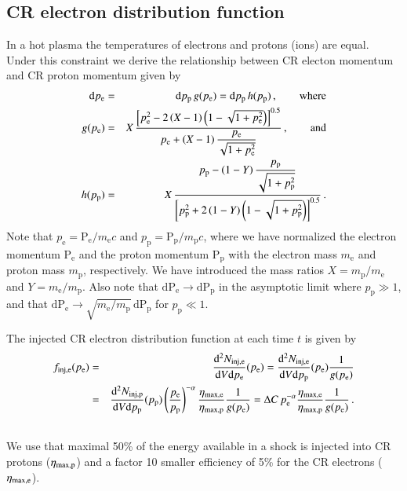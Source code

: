 \documentclass[useAMS,usenatbib]{mn2e}
\newcommand{\dd}{\mathrm{d}}
\newcommand{\p}{\mathrm{p}}
\newcommand{\Pp}{\mathrm{P}_\mathrm{p}}
\newcommand{\Pe}{\mathrm{P}_\mathrm{e}}
\newcommand{\pp}{p_\mathrm{p}}
\newcommand{\pe}{p_\mathrm{e}}
\newcommand{\e}{\mathrm{e}}
\begin{document}
\subsection{CR electron distribution function} 
In a hot plasma the temperatures of electrons and protons (ions) are
equal. Under this constraint we derive the relationship between CR
electon momentum and CR proton momentum given by
\begin{eqnarray}
  \label{eq:pe_pp}
\dd \pe &=& \dd \pp \,g(\pe) =  \dd \pp \,h(\pp)\,,\qquad \rmn{where}\\
g(\pe) &=& X \,\frac{\left[\pe^2-2\left(X-1\right)\left(1-\sqrt{1+\pe^2}\right)\right]^{0.5}}{\displaystyle\pe+\left(X-1\right)\frac{\pe}{\sqrt{1+\pe^2}}}\,,\qquad \rmn{and}\\
h(\pp) &=& X \,\frac{\displaystyle\pp-\left(1-Y\right)\frac{\pp}{\sqrt{1+\pp^2}}}{\left[\pp^2+2\left(1-Y\right)\left(1-\sqrt{1+\pp^2}\right)\right]^{0.5}}\,.\\
\end{eqnarray}
Note that $\pe = \Pe/m_\e c$ and $\pp = \Pp/m_\p c$, where we have
normalized the electron momentum $\Pe$ and the proton momentum $\Pp$
with the electron mass $m_\e$ and proton mass $m_\p$, respectively. We
have introduced the mass ratios $X=m_\p/m_\e$ and $Y=m_\e/m_\p$. Also
note that $\dd \Pe\rightarrow \dd \Pp$ in the asymptotic limit where
$\pp\gg 1$, and that $\dd \Pe\rightarrow \sqrt{m_\e / m_\p}\,\dd \Pp$ for
$\pp\ll 1$. 

The injected CR electron distribution function at each time $t$ is
given by
\begin{eqnarray}
  \label{eq:f_inj_e}
  f_\rmn{inj,e}(p_\e) &=&  \frac{\dd^2 N_\rmn{inj,e}}{\dd V \dd p_\e}(p_\e) = 
\frac{\dd^2 N_\rmn{inj,e}}{\dd V \dd p_\p}(p_\e)\frac{1}{g(p_\e)} \nonumber\\
&=& \frac{\dd^2 N_\rmn{inj,p}}{\dd V \dd p_\p}(p_\p)
\left(\frac{p_\e}{p_\p}\right)^{-\alpha}\frac{\eta_\rmn{max,e}}{\eta_\rmn{max,p}}\frac{1}{g(p_\e)} = 
\Delta C\,p_\e^{-\alpha}\frac{\eta_\rmn{max,e}}{\eta_\rmn{max,p}}\frac{1}{g(p_\e)}\,.
 \nonumber\\
&&
\end{eqnarray}
We use that maximal 50\% of the energy available in a shock is
injected into CR protons ($\eta_{\mathrm{max,p}}$) and a factor 10 smaller
efficiency of 5\% for the CR electrons ($\eta_{\mathrm{max,e}}$).
\end{document}
